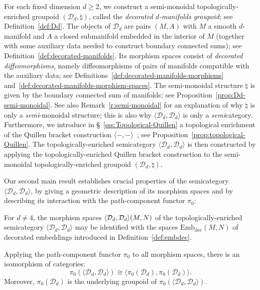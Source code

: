 \documentclass[AHL,Unicode,published]{cedram}
\newcommand{\rdec}{\mathrm{dec}}
\newcommand{\cD}{\mathcal{D}}
\newcommand{\embdec}{\ensuremath{\mathrm{Emb}_{\rdec}}}
\renewcommand{\geq}{\geqslant}
\begin{document}
For each fixed dimension $d\geq 2$, we construct a semi-monoidal topologically-enriched groupoid $(\cD_{d},\natural)$, called the \emph{decorated $d$-manifolds groupoid}; see Definition~\ref{def:Dd}. The objects of $\cD_{d}$ are pairs $(M,A)$ with $M$ a smooth $d$-manifold and $A$ a closed submanifold embedded in the interior of $M$ (together with some auxiliary data needed to construct boundary connected sums); see Definition~\ref{def:decorated-manifolds}. Its morphism spaces consist of \emph{decorated diffeomorphisms}, namely diffeomorphisms of pairs of manifolds compatible with the auxiliary data; see Definitions~\ref{def:decorated-manifolds-morphisms} and~\ref{def:decorated-manifolds-morphism-spaces}. The semi-monoidal structure $\natural$ is given by the boundary connected sum of manifolds; see Proposition~\ref{prop:Dd-semi-monoidal}. See also Remark~\ref{r:semi-monoidal} for an explanation of why $\natural$ is only a \emph{semi}-monoidal structure; this is also why $\langle \cD_{d},\cD_{d} \rangle$ is only a \emph{semi}category. Furthermore, we introduce in \S~\ref{sss:Topological-Quillen} a topological enrichment of the Quillen bracket construction $\langle -,- \rangle$~\cite[p.~219]{graysonQuillen}; see Proposition~\ref{prop:topological-Quillen}. The topologically-enriched semicategory $\langle \cD_{d},\cD_{d} \rangle$ is then constructed by applying the topologically-enriched Quillen bracket construction to the semi-monoidal topologically-enriched groupoid $(\cD_{d},\natural)$.

Our second main result establishes crucial properties of the semicategory $\langle \cD_{d},\cD_{d} \rangle$, by giving a geometric description of its morphism spaces and by describing its interaction with the path-component functor $\pi_{0}$:

\begin{theo}\label{athm:thm_B}
For $d \neq 4$, the morphism spaces $\langle \cD_{d}, \cD_{d} \rangle\newline(M,N)$ of the topologically-enriched semicategory $\langle \cD_{d}, \cD_{d} \rangle$ may be identified with the spaces $\embdec(M,N)$ of decorated embeddings introduced in Definition~\ref{def:embdec}.

Applying the path-component functor $\pi_{0}$ to all morphism spaces, there is an isomorphism of categories:
\begin{equation}\label{eq:ThmB_iso_pi0}
\pi_{0}(\langle \cD_{d},\cD_{d} \rangle) \cong \langle\pi_{0}(\cD_{d}),\pi_{0}(\cD_{d})\rangle.
\end{equation}
Moreover, $\pi_{0}(\cD_{d})$ is the underlying groupoid of $\pi_{0}(\langle \cD_{d},\cD_{d} \rangle)$.
\end{theo}
\end{document}
